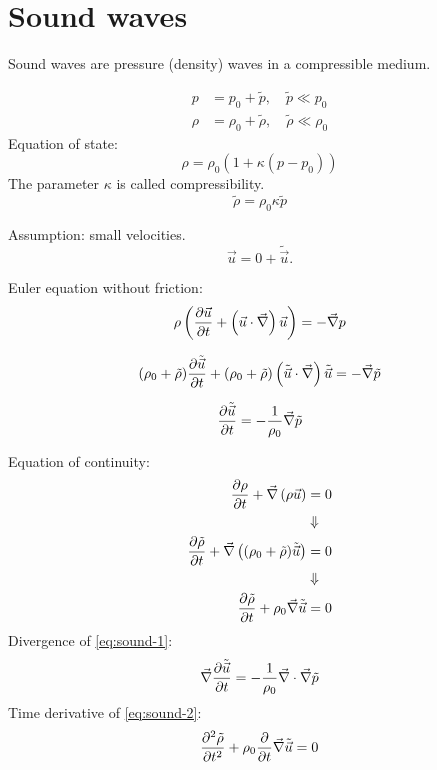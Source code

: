 \section{Sound waves}
Sound waves are pressure (density) waves in a compressible medium.

\begin{align}
p&=p_0+\tilde{p}, \quad\tilde{p}\ll p_0\\
\rho&=\rho_0+\tilde{\rho}, \quad\tilde{\rho}\ll\rho_0
\end{align}
Equation of state:
\begin{equation}
\rho=\rho_0(1+\kappa(p-p_0))
\end{equation}
The parameter $\kappa$ is called compressibility.
\begin{equation}
\tilde{\rho} = \rho_0\kappa\tilde{p}
\end{equation}

Assumption: small velocities.
\begin{equation}
\vec{u}=0+\tilde{\vec{u}}.
\end{equation}

Euler equation without friction:
\begin{equation}
\rho\left(\frac{\partial \vec{u}}{\partial t}+\left(\vec{u}\cdot\vec{\nabla}\right)\vec{u}\right)=-\vec{\nabla}p
\end{equation}

\begin{equation}
(\rho_0 + \tilde{\rho})\frac{\partial \tilde{\vec{u}}}{\partial t}+(\rho_0+\tilde{\rho})\left(\tilde{\vec{u}}\cdot\vec{\nabla}\right)\tilde{\vec{u}} = -\vec{\nabla}\tilde{p}
\end{equation}

\begin{equation}\label{eq:sound-1}
\frac{\partial \tilde{\vec{u}}}{\partial t}=-\frac{1}{\rho_0}\vec{\nabla}\tilde{p}
\end{equation}

Equation of continuity:
\begin{align}
\frac{\partial \rho}{\partial t}+\vec{\nabla}\left(\rho\vec{u}\right)&=0\\
&\Downarrow\notag\\
\frac{\partial \tilde{\rho}}{\partial t}+\vec{\nabla}\left((\rho_0+\tilde{\rho})\tilde{\vec{u}}\right) &= 0\\
&\Downarrow\notag\\
\frac{\partial \tilde{\rho}}{\partial t}+\rho_0\vec{\nabla}\tilde{\vec{u}}&=0\label{eq:sound-2}
\end{align}
Divergence of \eqref{eq:sound-1}:
\begin{equation}
\vec{\nabla}\frac{\partial \tilde{\vec{u}}}{\partial t}=-\frac{1}{\rho_0}\vec{\nabla}\cdot\vec{\nabla}\tilde{p}
\end{equation}
Time derivative of \eqref{eq:sound-2}:
\begin{equation}
\frac{\partial^2 \tilde{\rho}}{\partial t^2}+\rho_0\frac{\partial }{\partial t}\vec{\nabla}\tilde{\vec{u}}=0
\end{equation}

